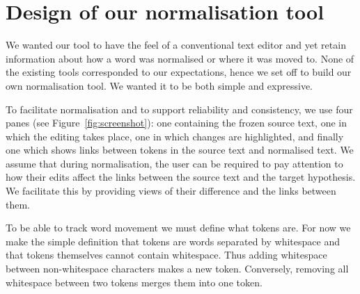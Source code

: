\documentclass[10pt, a4paper]{article}
\newcommand{\dan}[1]{{\color{Fuchsia}{Dan: #1}}}
\newcommand{\elena}[1]{{\color{BrickRed}{Elena: #1}}}
\newcommand{\mats}[1]{{\color{Blue}{Mats: #1}}}
\begin{document}

\section{Design of our normalisation tool}
\label{sec:norm_tool}

We wanted our tool to have the feel of a conventional text editor and yet retain
information about how a word was normalised or where it was moved to. None of the existing tools corresponded to our expectations, hence we set off to build our own normalisation tool. We wanted it to be both simple and expressive.

To facilitate normalisation and to support reliability and consistency,
we use four panes (see Figure~\ref{fig:screenshot}): one containing the
frozen source text, one in which the editing takes place, one in which
changes are highlighted, and finally one which shows links between tokens in the source text and normalised text.
We assume that during normalisation, the user can be required to pay attention
to how their edits affect the links between the source text and the target
hypothesis. We facilitate this by providing views of their difference and
the links between them.

To be able to track word movement we must define what tokens are.
For now we make the simple definition that tokens are words separated
by whitespace and that tokens themselves cannot contain whitespace.
Thus adding whitespace between non-whitespace characters makes a new token.
Conversely, removing all whitespace between two tokens merges them into one token.
\end{document}
